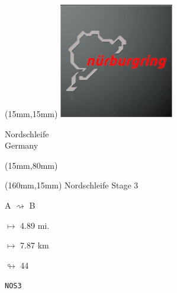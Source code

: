 \begin{textblock*}{50mm}(15mm,15mm)%
\includegraphics[width=50mm]{LG/2015-05-20_00088.png}
\par Nordschleife\\ Germany
\end{textblock*}
\begin{textblock*}{185mm}(15mm,80mm)%
\end{textblock*}
\begin{textblock*}{40mm}(160mm,15mm)%
Nordschleife Stage 3
\par A $\rightsquigarrow$ B
\Large
\par$\mapsto$ 4.89 mi.
\par$\mapsto$ 7.87 km
\par$\looparrowright$ 44
\par\hfill\tiny\tt NOS3\\
\end{textblock*}
\null\newpage

